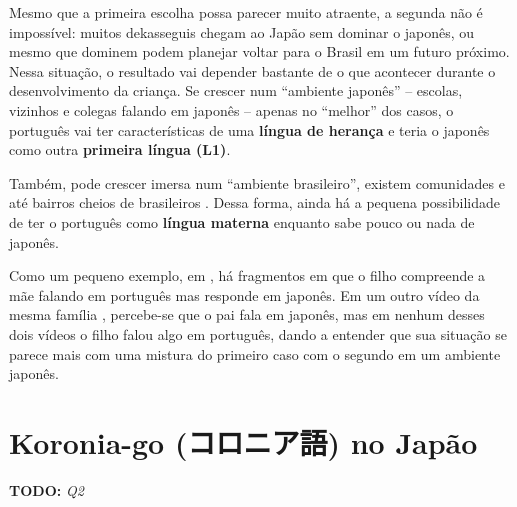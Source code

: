 \documentclass{article}
\newcommand{\jap}[1]{#1}
\newcommand{\todo}[1]{\textbf{TODO:} \textit{#1}}
\newcommand{\keyword}[1]{\textbf{#1}}
\newcommand{\koroniago}{\jap{コロニア語}}
\begin{document}
Mesmo que a primeira escolha possa parecer muito atraente,
a segunda não é impossível:
muitos dekasseguis chegam ao Japão sem dominar o japonês,
ou mesmo que dominem podem planejar voltar para o Brasil
em um futuro próximo.
Nessa situação, o resultado vai depender bastante
de o que acontecer durante o desenvolvimento da criança.
Se crescer num ``ambiente japonês''
-- escolas, vizinhos e colegas falando em japonês --
apenas no ``melhor'' dos casos,
o português vai ter características de uma
\keyword{língua de herança} e
teria o japonês como outra \keyword{primeira língua (L1)}.

Também, pode crescer imersa num ``ambiente brasileiro'',
existem comunidades e até bairros cheios de brasileiros
\cite{japaoimigrantesbrasileiros} \cite{escolasbrjp}
\cite{regioesmaisbrjp}
\cite{videobairrojpcarla} \cite{videobairrojpfernando}
\cite{videocidadebr}.
Dessa forma, ainda há a pequena possibilidade de
ter o português como \keyword{língua materna}
enquanto sabe pouco ou nada de japonês.

Como um pequeno exemplo,
em \cite{videobairrojpcarla},
há fragmentos em que o filho compreende a mãe falando
em português mas responde em japonês.
Em um outro vídeo da mesma família \cite{videoramencarla},
percebe-se que o pai fala em japonês,
mas em nenhum desses dois vídeos
o filho falou algo em português,
dando a entender que sua situação
se parece mais com uma mistura do primeiro caso
com o segundo em um ambiente japonês.

\section{Koronia-go (\koroniago{}) no Japão}

\todo{Q2}

\newpage

\nocite{*}


\end{document}
